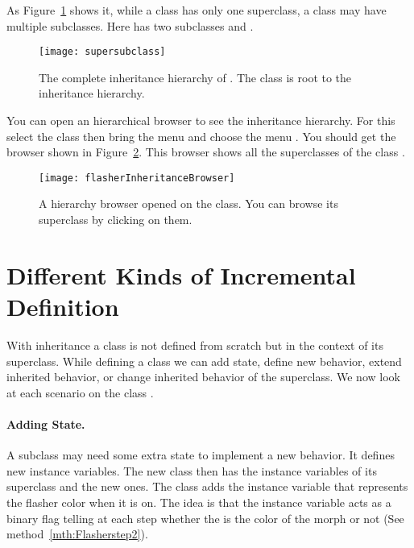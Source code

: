 As Figure~\ref{fig:supersubclass} shows it, while a class has only one superclass, a class may have multiple subclasses. Here  has two subclasses  and .

\begin{figure}[ht]
\begin{center}
\texttt{[image: supersubclass]}
\caption{The complete inheritance hierarchy of . The class  is root to the inheritance hierarchy.\label{fig:supersubclass}}
\end{center}
\end{figure}

You can open an hierarchical browser to see the inheritance hierarchy. For this select the class  then bring the menu and choose the menu . You should get the browser shown in Figure~\ref{fig:flasherInheritanceBrowser}. This browser shows all the superclasses of the class .

\begin{figure}[h]
\begin{center}
\texttt{[image: flasherInheritanceBrowser]}
\caption{A hierarchy browser opened on the  class. You can browse its superclass by clicking on them.\label{fig:flasherInheritanceBrowser}}
\end{center}
\end{figure}




\section{Different Kinds of Incremental Definition}
With inheritance a class is not defined from scratch but in the context of its superclass. While defining a class we can add state, define new behavior, extend inherited behavior, or change inherited behavior of the superclass. We now look at each scenario on the class .

\paragraph{Adding State.} A subclass may need some extra state to implement a new behavior. It defines new instance variables. The new class then has the instance variables of its superclass and the new ones. The class  adds the  instance variable that represents the flasher color when it is on. The idea is that the  instance variable acts as a binary flag telling at each step whether the  is the color of the morph or not (See method~\ref{mth:Flasherstep2}). 


